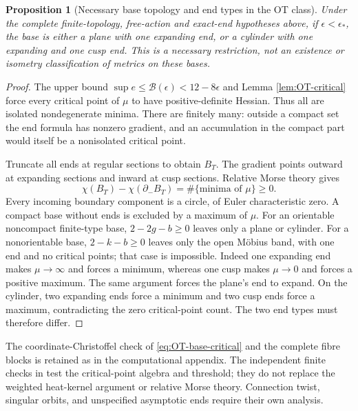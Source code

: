 \documentclass[a4paper,11pt]{article}
\numberwithin{equation}{section}
\newtheorem{proposition}[theorem]{Proposition}
\theoremstyle{definition}
\begin{document}
\begin{proposition}[Necessary base topology and end types in the OT class]\label{prop:OT-Morse}
Under the complete finite-topology, free-action and exact-end hypotheses above, if $\epsilon<\epsilon_*$, the base is either a plane with one expanding end, or a cylinder with one expanding and one cusp end. This is a necessary restriction, not an existence or isometry classification of metrics on these bases.
\end{proposition}
\begin{proof}
The upper bound $\sup e\le\mathcal B(\epsilon)<12-8\epsilon$ and Lemma \ref{lem:OT-critical} force every critical point of $\mu$ to have positive-definite Hessian. Thus all are isolated nondegenerate minima. There are finitely many: outside a compact set the end formula has nonzero gradient, and an accumulation in the compact part would itself be a nonisolated critical point.

Truncate all ends at regular sections to obtain $B_T$. The gradient points outward at expanding sections and inward at cusp sections. Relative Morse theory gives
\[
 \chi(B_T)-\chi(\partial_-B_T)
   =\#\{\text{minima of }\mu\}\ge0.
\]
Every incoming boundary component is a circle, of Euler characteristic zero. A compact base without ends is excluded by a maximum of $\mu$. For an orientable noncompact finite-type base, $2-2g-b\ge0$ leaves only a plane or cylinder. For a nonorientable base, $2-k-b\ge0$ leaves only the open M\"obius band, with one end and no critical points; that case is impossible. Indeed one expanding end makes $\mu\to\infty$ and forces a minimum, whereas one cusp makes $\mu\to0$ and forces a positive maximum. The same argument forces the plane's end to expand. On the cylinder, two expanding ends force a minimum and two cusp ends force a maximum, contradicting the zero critical-point count. The two end types must therefore differ.
\end{proof}
The coordinate-Christoffel check of \eqref{eq:OT-base-critical} and the complete fibre blocks is retained as  in the computational appendix. The independent finite checks in  test the critical-point algebra and threshold; they do not replace the weighted heat-kernel argument or relative Morse theory. Connection twist, singular orbits, and unspecified asymptotic ends require their own analysis.
\end{document}
